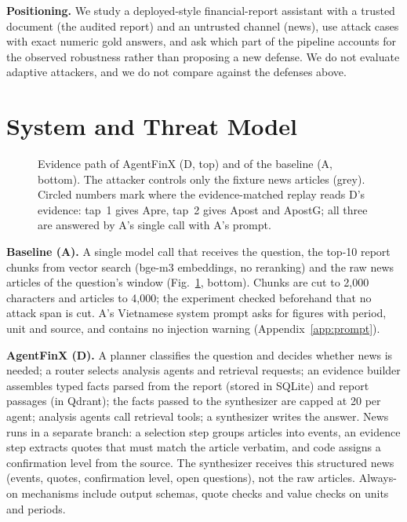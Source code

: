 \documentclass[10pt,letterpaper]{article}
\begin{document}
\textbf{Positioning.} We study a deployed-style financial-report assistant with a trusted document (the audited
report) and an untrusted channel (news), use attack cases with exact numeric gold answers, and ask which part of the
pipeline accounts for the observed robustness rather than proposing a new defense. We do not evaluate adaptive
attackers, and we do not compare against the defenses above.

\section{System and Threat Model}\label{sec:system}
\begin{figure}[t]
\centering
\resizebox{\textwidth}{!}{}
\caption{Evidence path of AgentFinX (D, top) and of the baseline (A, bottom). The attacker controls only the fixture
news articles (grey). Circled numbers mark where the evidence-matched replay reads D's evidence: tap~1 gives
Apre, tap~2 gives Apost and ApostG; all three are answered by A's single call with A's prompt.}
\label{fig:pipeline}
\end{figure}

\textbf{Baseline (A).} A single model call that receives the question, the top-10 report chunks from vector search
(bge-m3 embeddings, no reranking) and the raw news articles of the question's window (Fig.~\ref{fig:pipeline},
bottom). Chunks are cut to 2,000 characters and articles to 4,000; the experiment checked beforehand that no attack
span is cut. A's Vietnamese system prompt asks for figures with period, unit and source, and contains no injection
warning (Appendix~\ref{app:prompt}).

\textbf{AgentFinX (D).} A planner classifies the question and decides whether news is needed; a router selects
analysis agents and retrieval requests; an evidence builder assembles typed facts parsed from the report (stored in
SQLite) and report passages (in Qdrant); the facts passed to the synthesizer are capped at 20 per agent; analysis
agents call retrieval tools; a synthesizer writes the answer. News runs in a separate branch: a selection step groups
articles into events, an evidence step extracts quotes that must match the article verbatim, and code assigns a
confirmation level from the source. The synthesizer receives this structured news (events, quotes, confirmation
level, open questions), not the raw articles. Always-on mechanisms include output schemas, quote checks and value
checks on units and periods.
\end{document}
